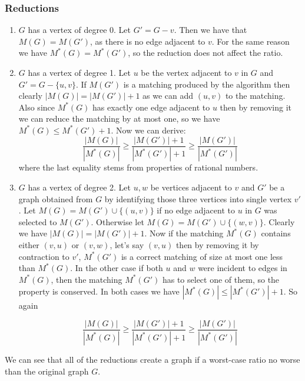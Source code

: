 \subsubsection{Reductions}
\begin{enumerate}
    \item $G$ has a vertex of degree 0. Let $G' = G - v$. Then we have that
        $M(G) = M(G')$, as there is no edge adjacent to $v$. For the same reason
        we have $M^*(G) = M^*(G')$, so the reduction does not affect the ratio.
    \item $G$ has a vertex of degree 1. Let $u$ be the vertex adjacent to $v$ in
        $G$ and $G' = G - \{u, v\}$. If $M(G')$ is a matching produced by the
        algorithm then clearly $|M(G)| = |M(G')| + 1$ as we can add $(u,v)$ to
        the matching. Also since $M^*(G)$ has exactly one edge adjacent to $u$
        then by removing it we can reduce the matching by at most one, so we
        have $M^*(G) \leq M^*(G') + 1$. Now we can derive:
        $$
         \frac{|M(G)|}{|M^*(G)|} \geq
         \frac{|M(G')| + 1}{|M^*(G')| + 1} \geq
         \frac{|M(G')|}{|M^*(G')|}
        $$
        where the last equality stems from properties of rational numbers.
    \item $G$ has a vertex of degree 2. Let $u, w$ be vertices adjacent to $v$
        and $G'$ be a graph obtained from $G$ by identifying those three
        vertices into single vertex $v'$. Let $M(G) = M(G') \cup \{(u,v)\}$ if no
        edge adjacent to $u$ in $G$ was selected to $M(G')$. Otherwise let
        $M(G) = M(G') \cup \{(w,v)\}$. Clearly we have $|M(G)| = |M(G')| + 1$. Now
        if the matching $M^*(G)$ contains either $(v,u)$ or $(v,w)$, let's say
        $(v,u)$ then by removing it by contraction to $v'$, $M^*(G')$ is a
        correct matching of size at most one less than $M^*(G)$. In the other
        case if both $u$ and $w$ were incident to edges in $M^*(G)$, then the
        matching $M^*(G')$ has to select one of them, so the property is
        conserved. In both cases we have $|M^*(G)| \leq |M^*(G')| + 1$. So again

        $$
         \frac{|M(G)|}{|M^*(G)|} \geq
         \frac{|M(G')| + 1}{|M^*(G')| + 1} \geq
         \frac{|M(G')|}{|M^*(G')|}
        $$
\end{enumerate}
We can see that all of the reductions create a graph if a worst-case ratio no
worse than the original graph $G$.
